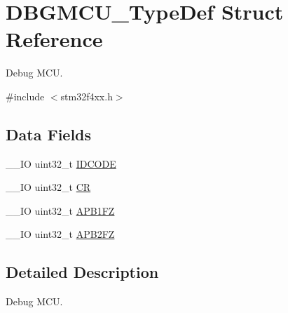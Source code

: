 \hypertarget{struct_d_b_g_m_c_u___type_def}{\section{D\-B\-G\-M\-C\-U\-\_\-\-Type\-Def Struct Reference}
\label{struct_d_b_g_m_c_u___type_def}
}


Debug M\-C\-U.  




{\ttfamily \#include $<$stm32f4xx.\-h$>$}

\subsection*{Data Fields}
\begin{DoxyCompactItemize}
\item 
\-\_\-\-\_\-\-I\-O uint32\-\_\-t \hyperlink{struct_d_b_g_m_c_u___type_def_a24df28d0e440321b21f6f07b3bb93dea}{I\-D\-C\-O\-D\-E}
\item 
\-\_\-\-\_\-\-I\-O uint32\-\_\-t \hyperlink{struct_d_b_g_m_c_u___type_def_ab40c89c59391aaa9d9a8ec011dd0907a}{C\-R}
\item 
\-\_\-\-\_\-\-I\-O uint32\-\_\-t \hyperlink{struct_d_b_g_m_c_u___type_def_a5eaefc557573ae7bdc632ef6b6d574b5}{A\-P\-B1\-F\-Z}
\item 
\-\_\-\-\_\-\-I\-O uint32\-\_\-t \hyperlink{struct_d_b_g_m_c_u___type_def_a4628a8c32f97ef93b15b2b503ef90c75}{A\-P\-B2\-F\-Z}
\end{DoxyCompactItemize}


\subsection{Detailed Description}
Debug M\-C\-U. 


